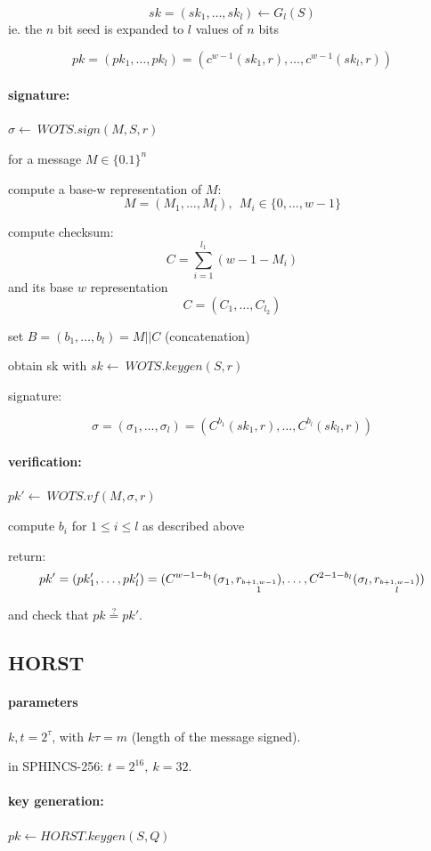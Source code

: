\documentclass{article}
\theoremstyle{definition}
\begin{document}
$$sk=(sk_1, \ldots, sk_l) \leftarrow G_l(S)$$
ie. the $n$ bit seed is expanded to $l$ values of $n$ bits

$$pk = (pk_1, \ldots, pk_l) = (c^{w-1}(sk_1, r), \ldots, c^{w-1}(sk_l, r))$$

\paragraph{signature:} $\sigma \leftarrow~ WOTS.sign(M, S, r)$

for a message $M \in \{0.1\}^n$

compute a base-w representation of $M$:
$$M = (M_1, \ldots, M_l),~~ M_i \in \{0, \ldots, w-1\}$$

compute checksum:
$$C = \sum_{i=1}^{l_1} (w-1-M_i)$$
and its base $w$ representation
$$C=(C_1, \ldots, C_{l_2})$$

set $B=(b_1, \ldots, b_l)=M||C$ (concatenation)

obtain sk with $sk \leftarrow~ WOTS.keygen(S,r)$

signature:

$$\sigma = (\sigma_1, \ldots, \sigma_l) = (C^{b_1}(sk_1, r), \ldots, C^{b_l}(sk_l, r))$$

\paragraph{verification:} $pk' \leftarrow~ WOTS.vf(M, \sigma, r)$

compute $b_i$ for $1 \leq i \leq l$ as described above

return:
$$pk' = (pk_1', \ldots, pk_l')\\
=(C^{w-1-b_1}(\sigma_1, r_{\stackrel{b+1, w-1}{1}}), \ldots, C^{2-1-b_l}(\sigma_l, r_{\stackrel{b+1, w-1}{l}}))
$$

and check that $pk \stackrel{?}{=} pk'$.

\subsection{HORST}
\paragraph{parameters}

$k, t=2^\tau$, with $k\tau=m$ (length of the message signed).

in SPHINCS-256: $t=2^16,~ k=32$.

\paragraph{key generation:} $pk \leftarrow HORST.keygen(S, Q)$
\end{document}
